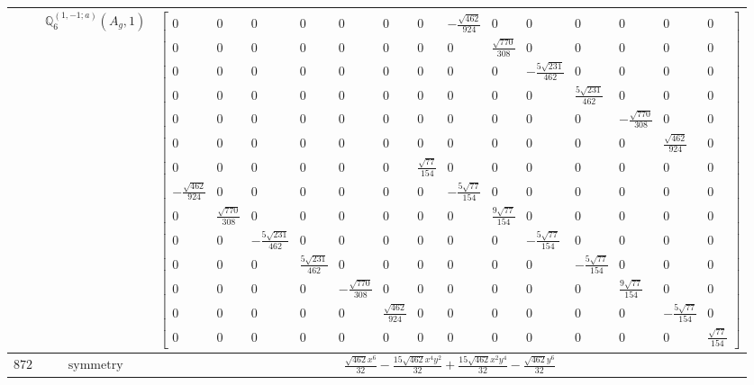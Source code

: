 \documentclass[fleqn,8pt,landscape]{jsarticle}
\begin{document}
\begin{longtable}{ccc}
$  $ & $ \mathbb{Q}_{6}^{(1,-1;a)}(A_{g},1) $ & $ \begin{bmatrix} 0 & 0 & 0 & 0 & 0 & 0 & 0 & - \frac{\sqrt{462}}{924} & 0 & 0 & 0 & 0 & 0 & 0 \\ 0 & 0 & 0 & 0 & 0 & 0 & 0 & 0 & \frac{\sqrt{770}}{308} & 0 & 0 & 0 & 0 & 0 \\ 0 & 0 & 0 & 0 & 0 & 0 & 0 & 0 & 0 & - \frac{5 \sqrt{231}}{462} & 0 & 0 & 0 & 0 \\ 0 & 0 & 0 & 0 & 0 & 0 & 0 & 0 & 0 & 0 & \frac{5 \sqrt{231}}{462} & 0 & 0 & 0 \\ 0 & 0 & 0 & 0 & 0 & 0 & 0 & 0 & 0 & 0 & 0 & - \frac{\sqrt{770}}{308} & 0 & 0 \\ 0 & 0 & 0 & 0 & 0 & 0 & 0 & 0 & 0 & 0 & 0 & 0 & \frac{\sqrt{462}}{924} & 0 \\ 0 & 0 & 0 & 0 & 0 & 0 & \frac{\sqrt{77}}{154} & 0 & 0 & 0 & 0 & 0 & 0 & 0 \\ - \frac{\sqrt{462}}{924} & 0 & 0 & 0 & 0 & 0 & 0 & - \frac{5 \sqrt{77}}{154} & 0 & 0 & 0 & 0 & 0 & 0 \\ 0 & \frac{\sqrt{770}}{308} & 0 & 0 & 0 & 0 & 0 & 0 & \frac{9 \sqrt{77}}{154} & 0 & 0 & 0 & 0 & 0 \\ 0 & 0 & - \frac{5 \sqrt{231}}{462} & 0 & 0 & 0 & 0 & 0 & 0 & - \frac{5 \sqrt{77}}{154} & 0 & 0 & 0 & 0 \\ 0 & 0 & 0 & \frac{5 \sqrt{231}}{462} & 0 & 0 & 0 & 0 & 0 & 0 & - \frac{5 \sqrt{77}}{154} & 0 & 0 & 0 \\ 0 & 0 & 0 & 0 & - \frac{\sqrt{770}}{308} & 0 & 0 & 0 & 0 & 0 & 0 & \frac{9 \sqrt{77}}{154} & 0 & 0 \\ 0 & 0 & 0 & 0 & 0 & \frac{\sqrt{462}}{924} & 0 & 0 & 0 & 0 & 0 & 0 & - \frac{5 \sqrt{77}}{154} & 0 \\ 0 & 0 & 0 & 0 & 0 & 0 & 0 & 0 & 0 & 0 & 0 & 0 & 0 & \frac{\sqrt{77}}{154} \end{bmatrix} $ \\ \hline
$ 872 $ & $ \text{symmetry} $ & $ \frac{\sqrt{462} x^{6}}{32} - \frac{15 \sqrt{462} x^{4} y^{2}}{32} + \frac{15 \sqrt{462} x^{2} y^{4}}{32} - \frac{\sqrt{462} y^{6}}{32} $ \\

\end{longtable}
\end{document}
